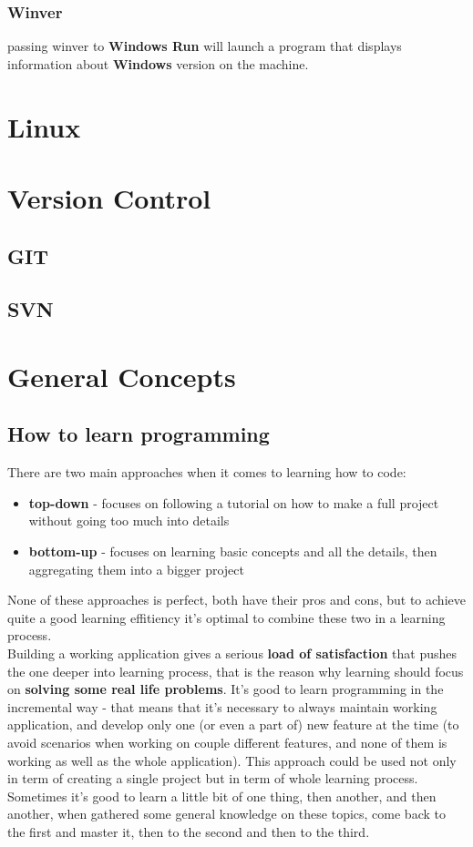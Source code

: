 \documentclass[11pt,a4paper]{article}
\begin{document}
\subsubsection{Winver}
passing winver to \textbf{Windows Run} will launch a program that displays information about \textbf{Windows} version on the machine.

\section{Linux}

\section{Version Control}

\subsection{GIT}

\subsection{SVN}

\section{General Concepts}

\subsection{How to learn programming}

There are two main approaches when it comes to learning how to code:
\begin{itemize}
\item \textbf{top-down} - focuses on following a tutorial on how to make a full project without going too much into details 
\item \textbf{bottom-up} - focuses on learning basic concepts and all the details, then aggregating them into a bigger project
\end{itemize}
None of these approaches is perfect, both have their pros and cons, but to achieve quite a good learning effitiency it's optimal to combine these two in a learning process.\\

Building a working application gives a serious \textbf{load of satisfaction} that pushes the one deeper into learning process, that is the reason why learning should focus on \textbf{solving some real life problems}. It's good to learn programming in the incremental way - that means that it's necessary to always maintain working application, and develop only one (or even a part of) new feature at the time (to avoid scenarios when working on couple different features, and none of them is working as well as the whole application). This approach could be used not only in term of creating a single project but in term of whole learning process. Sometimes it's good to learn a little bit of one thing, then another, and then another, when gathered some general knowledge on these topics, come back to the first and master it, then to the second and then to the third.
\end{document}
